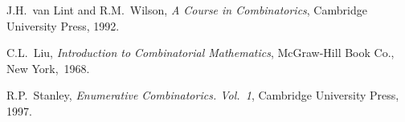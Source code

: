 \documentclass[a4paper]{article}
\begin{document}
\begin{thebibliography}{9}
 J.H.~van Lint and R.M.~Wilson,
{\sl A Course in Combinatorics}, Cambridge University Press, 1992.

 C.L.~Liu,
{\sl Introduction to Combinatorial Mathematics}, McGraw-Hill Book Co., New York,~1968.


 R.P.~Stanley,
{\sl Enumerative Combinatorics. Vol.~1}, Cambridge University Press, 1997.


\end{thebibliography}
\end{document}
